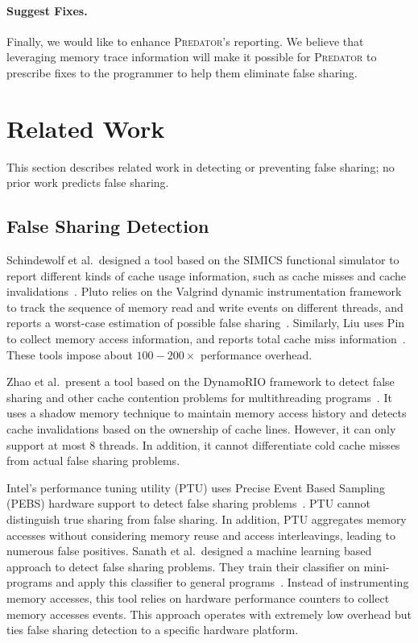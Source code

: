\documentclass[10pt]{sigplanconf}
\newcommand{\Predator}{{\scshape Predator}}
\begin{document}
\paragraph{Suggest Fixes.} Finally, we would like to enhance \Predator{}'s reporting. We believe that leveraging memory trace information will make it possible for \Predator{} to prescribe fixes to the programmer to help them eliminate false sharing.


\section{Related Work}
\label{sec:relatedwork}

This section describes related work in detecting or preventing false sharing; no prior work predicts false sharing.

\subsection{False Sharing Detection}
Schindewolf et al.\ designed a tool based on the SIMICS functional simulator to report different kinds of cache usage information, such as cache misses and cache invalidations~\cite{falseshare:simulator}. Pluto relies on the Valgrind dynamic instrumentation framework to track the sequence of memory read and write events on different threads, and reports a worst-case estimation of possible false sharing~\cite{falseshare:binaryinstrumentation1}.
Similarly, Liu uses Pin to collect memory access information, and reports total cache miss information~\cite{falseshare:binaryinstrumentation2}.
These tools impose about $100-200\times$ performance overhead.

Zhao et al.\ present a tool based on the DynamoRIO framework to detect false sharing and other cache contention problems
for multithreading programs~\cite{qinzhaodetection}. 
It uses a shadow memory technique to maintain memory access history and detects cache invalidations based on the ownership of cache lines. However, it can only support at most $8$ threads. In addition, it cannot differentiate cold cache misses from actual false sharing problems.

Intel's performance tuning utility (PTU) uses Precise Event Based Sampling (PEBS) hardware support to detect false sharing problems~\cite{detect:ptu,detect:intel}.  PTU cannot distinguish true sharing from false sharing. In addition, PTU aggregates memory accesses without considering memory reuse and access interleavings, leading to numerous false positives. Sanath et al.\ designed a machine learning based approach to detect false sharing problems. They train their classifier on mini-programs and apply this classifier to general programs~\cite{mldetect}. Instead of instrumenting memory accesses, this tool relies on hardware performance counters to collect memory accesses events. This approach operates with extremely low overhead but ties false sharing detection to a specific hardware platform.
\end{document}
